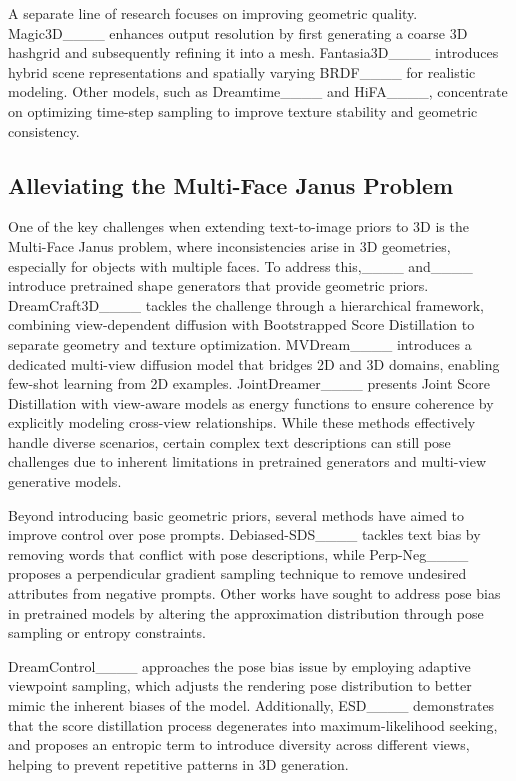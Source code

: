 A separate line of research focuses on improving geometric quality. Magic3D____ enhances output resolution by first generating a coarse 3D hashgrid and subsequently refining it into a mesh. Fantasia3D____ introduces hybrid scene representations and spatially varying BRDF____ for realistic modeling. Other models, such as Dreamtime____ and HiFA____, concentrate on optimizing time-step sampling to improve texture stability and geometric consistency.


\subsection{Alleviating the Multi-Face Janus Problem}
One of the key challenges when extending text-to-image priors to 3D is the Multi-Face Janus problem, where inconsistencies arise in 3D geometries, especially for objects with multiple faces. To address this,____ and____ introduce pretrained shape generators that provide geometric priors. DreamCraft3D____ tackles the challenge through a hierarchical framework, combining view-dependent diffusion with Bootstrapped Score Distillation to separate geometry and texture optimization. MVDream____ introduces a dedicated multi-view diffusion model that bridges 2D and 3D domains, enabling few-shot learning from 2D examples. JointDreamer____ presents Joint Score Distillation with view-aware models as energy functions to ensure coherence by explicitly modeling cross-view relationships. While these methods effectively handle diverse scenarios, certain complex text descriptions can still pose challenges due to inherent limitations in pretrained generators and multi-view generative models.

Beyond introducing basic geometric priors, several methods have aimed to improve control over pose prompts. Debiased-SDS____ tackles text bias by removing words that conflict with pose descriptions, while Perp-Neg____ proposes a perpendicular gradient sampling technique to remove undesired attributes from negative prompts. Other works have sought to address pose bias in pretrained models by altering the approximation distribution through pose sampling or entropy constraints.

DreamControl____ approaches the pose bias issue by employing adaptive viewpoint sampling, which adjusts the rendering pose distribution to better mimic the inherent biases of the model. Additionally, ESD____ demonstrates that the score distillation process degenerates into maximum-likelihood seeking, and proposes an entropic term to introduce diversity across different views, helping to prevent repetitive patterns in 3D generation.